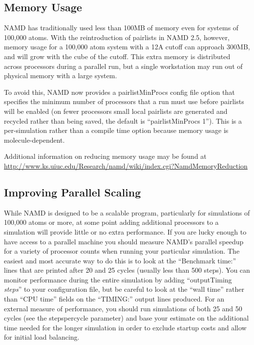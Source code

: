 \subsection{Memory Usage}

NAMD has traditionally used less than 100MB of memory even for systems
of 100,000 atoms.  With the reintroduction of pairlists in NAMD 2.5,
however, memory usage for a 100,000 atom system with a 12A cutoff can
approach 300MB, and will grow with the cube of the cutoff.  This extra
memory is distributed across processors during a parallel run, but a
single workstation may run out of physical memory with a large system.

To avoid this, NAMD now provides a pairlistMinProcs config file option
that specifies the minimum number of processors that a run must use
before pairlists will be enabled (on fewer processors small local
pairlists are generated and recycled rather than being saved, the
default is ``pairlistMinProcs 1'').  This is a per-simulation rather than
a compile time option because memory usage is molecule-dependent.

Additional information on reducing memory usage may be found at
\url{http://www.ks.uiuc.edu/Research/namd/wiki/index.cgi?NamdMemoryReduction}

\subsection{Improving Parallel Scaling}

While NAMD is designed to be a scalable program, particularly for
simulations of 100,000 atoms or more, at some point adding additional
processors to a simulation will provide little or no extra performance.
If you are lucky enough to have access to a parallel machine you should
measure NAMD's parallel speedup for a variety of processor counts when
running your particular simulation.  The easiest and most accurate way
to do this is to look at the ``Benchmark time:'' lines that are printed
after 20 and 25 cycles (usually less than 500 steps).  You can monitor
performance during the entire simulation by adding ``outputTiming {\em steps}''
to your configuration file, but be careful to look at the ``wall time''
rather than ``CPU time'' fields on the ``TIMING:'' output lines produced.
For an external measure of performance, you should run simulations of
both 25 and 50 cycles (see the stepspercycle parameter) and base your
estimate on the additional time needed for the longer simulation in
order to exclude startup costs and allow for initial load balancing.

